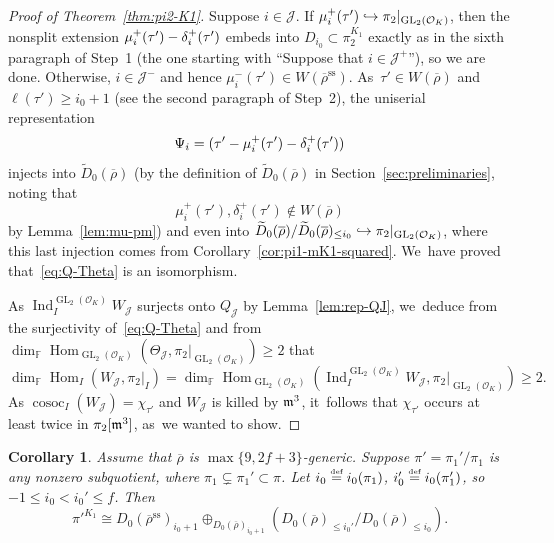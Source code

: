 \documentclass[JEP,XML,SOM,Unicode,NoFloatCountersInSection, NoEqCountersInSection,published]{cedram}
\newcommand\hto{\mathrel{\lhook\joinrel\to}}
\let\wt\widetilde
\newcommand{\defeq}{\stackrel{\textrm{\tiny{\upshape{def}}}}{=}}
\newcommand{\F}{\mathbb{F}}
\newcommand{\cJ}{{\mathcal{J}}}
\newcommand{\cO}{\mathcal{O}}
\renewcommand{\ss}{\mathrm{ss}}
\newcommand{\brho}{\overline{\rho}}
\DeclareMathOperator{\cosoc}{cosoc}
\DeclareMathOperator{\GL}{GL}
\DeclareMathOperator{\Hom}{Hom}
\DeclareMathOperator{\Ind}{Ind}
\theoremstyle{plain}
\newtheorem{cor}[prop]{Corollary}
\theoremstyle{definition}
\begin{document}
\begin{proof}[Proof of Theorem~\ref{thm:pi2-K1}]
Suppose $i \in \cJ$.
If $\mu_i^+(\tau') \hto \pi_2|_{\GL_2(\cO_K)}$, then the nonsplit extension $\mu_i^+(\tau') \-- \delta_i^+(\tau')$ embeds into $D_{i_0} \subset \pi_2^{K_1}$ exactly as in the sixth paragraph of Step~1 (the one starting with ``Suppose that $i \in \cJ^+$''), so we are done.
Otherwise, $i \in \cJ^-$ and hence $\mu_i^-(\tau') \in W(\brho^\ss)$. As~$\tau' \in W(\brho)$ and $\ell(\tau') \ge i_0+1$ (see the second paragraph of Step~2), the uniserial representation\vspace*{-3pt}
\[
\Psi_i = (\tau' \-- \mu_i^+(\tau') \-- \delta_i^+(\tau'))
\]
injects into $\wt D_0(\brho)$
(by the definition of $\wt D_0(\brho)$ in Section~\ref{sec:preliminaries}, noting that\vspace*{-3pt}
\[
\mu_i^+(\tau'), \delta_i^+(\tau') \notin W(\brho)
\]
by Lemma~\ref{lem:mu-pm})
and even into $\wt D_0(\brho)/\wt D_0(\brho)_{\le i_0} \hto \pi_2|_{\GL_2(\cO_K)}$, where this last injection comes from Corollary~\ref{cor:pi1-mK1-squared}. We~have proved that~\eqref{eq:Q-Theta} is an isomorphism.

As $\Ind_I^{\GL_2(\cO_K)} W_{\cJ}$ surjects onto $Q_{\cJ}$ by Lemma~\ref{lem:rep-QJ}, we~deduce from the surjectivity of~\eqref{eq:Q-Theta} and from $\dim_\F \Hom_{\GL_2(\cO_K)}(\Theta_{\cJ},\pi_2|_{\GL_2(\cO_K)}) \ge 2$ that\vspace*{-3pt}
\begin{equation*}
\dim_\F \Hom_I(W_{\cJ},\pi_2|_I) = \dim_\F \Hom_{\GL_2(\cO_K)}(\Ind_I^{\GL_2(\cO_K)} W_{\cJ},\pi_2|_{\GL_2(\cO_K)}) \ge 2.
\end{equation*}
As $\cosoc_I(W_{\cJ}) = \chi_{\tau'}$ and $W_\cJ$ is killed by $\mathfrak{m}^3$, it~follows that $\chi_{\tau'}$ occurs at least twice in $\pi_2[\mathfrak{m}^3]$, as~we wanted to show.
\end{proof}

\begin{cor}\label{cor:K1-subquot}
{Assume that $\brho$ is $\max\{9,2f+3\}$-generic.}
Suppose $\pi' = \pi_1'/\pi_1$ is any nonzero subquotient, where $\pi_1 \subsetneq \pi_1' \subset \pi$.
Let $i_0 \defeq i_0(\pi_1)$, $i_0' \defeq i_0(\pi_1')$, so~$-1 \le i_0 < i_0' \le f$.
Then\vspace*{-3pt}
\begin{equation*}
\pi'^{K_1} \cong D_0(\brho^\ss)_{i_0+1} \oplus_{D_0(\brho)_{i_0+1}} (D_0(\brho)_{\le i_0'}/D_0(\brho)_{\le i_0}).
\end{equation*}
\end{cor}
\end{document}
